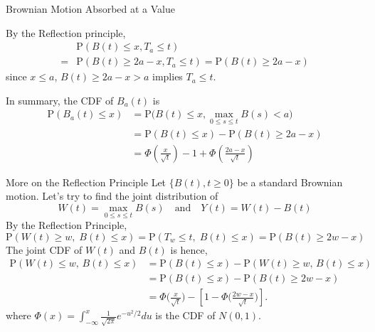 \documentclass[letterpaper]{beamer}
\def\p{\mathrm P}
\begin{document}
\begin{frame}{Brownian Motion Absorbed at a Value}
\begin{flushright}
%
\end{flushright}
\vspace{-30pt}By the Reflection principle,
\begin{align*}
&\p(B(t)\le x, T_a\le t)\\
={}&\p(B(t)\ge 2a-x, T_a\le t)=\p(B(t)\ge 2a-x)
\end{align*}
since $x\le a$, $B(t)\ge 2a-x>a$ implies $T_a\le t$.\par\medskip
In summary, the CDF of $B_a(t)$ is\vspace{-5pt}
\begin{align*}
\p(B_a(t)\le x)&=\p\Big(B(t)\le x, \max_{0\le s\le t}B(s)< a\Big)\\
&=\p(B(t)\le x)-\p(B(t)\ge 2a-x)\\
&=\Phi\left(\frac{x}{\sqrt{t}}\right)-1+\Phi\left(\frac{2a-x}{\sqrt{t}}\right)
\end{align*}
\end{frame}
\begin{frame}{More on the Reflection Principle}
Let $\{B(t), t \ge 0\}$ be a standard Brownian motion. Let's try to find the joint distribution of
$$W(t)=\max_{0\le s\le t}B(s) \quad\text{and}\quad  Y(t)=W(t)-B(t)$$
By the Reflection Principle,
$$
\p(W(t)\ge w,\; B(t)\le x)=\p(T_w\le t,\; B(t)\le x)=\p(B(t)\ge 2w-x)
$$
The joint CDF of $W(t)$ and $B(t)$ is hence,
\begin{align*}
\p(W(t)\le w,\, B(t)\le x)&=\p(B(t)\le x)-\p(W(t)\ge w,\, B(t)\le x)\\
&=\p(B(t)\le x)-\p(B(t)\ge 2w-x)\\
&=\Phi\Big(\frac{x}{\sqrt{t}}\Big)-\left[1-\Phi\Big(\frac{2w-x}{\sqrt{t}}\Big)\right].
\end{align*}
where $\Phi(x)=\int_{-\infty}^x\frac{1}{\sqrt{2\pi}}e^{-u^2/2}du$ is the CDF of $N(0,1)$.
\end{frame}
\end{document}

